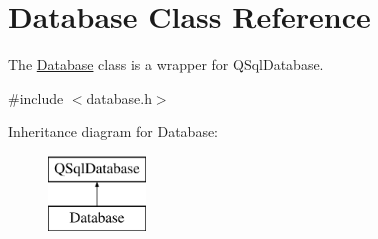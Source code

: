 \hypertarget{class_database}{}\section{Database Class Reference}
\label{class_database}


The \hyperlink{class_database}{Database} class is a wrapper for Q\+Sql\+Database.  




{\ttfamily \#include $<$database.\+h$>$}

Inheritance diagram for Database\+:\begin{figure}[H]
\begin{center}
\leavevmode
\includegraphics[height=2.000000cm]{class_database}
\end{center}
\end{figure}
